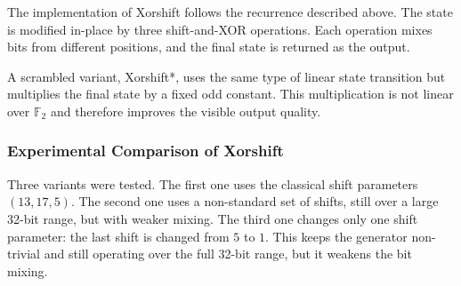 The implementation of Xorshift follows the recurrence described above. The state is modified in-place by three shift-and-XOR operations. Each operation mixes bits from different positions, and the final state is returned as the output.


A scrambled variant, Xorshift*, uses the same type of linear state transition but multiplies the final state by a fixed odd constant. This multiplication is not linear over $\mathbb{F}_2$ and therefore improves the visible output quality.


\subsubsection{Experimental Comparison of Xorshift}

Three variants were tested. The first one uses the classical shift parameters $(13,17,5)$. The second one uses a non-standard set of shifts, still over a large 32-bit range, but with weaker mixing. The third one changes only one shift parameter: the last shift is changed from $5$ to $1$. This keeps the generator non-trivial and still operating over the full 32-bit range, but it weakens the bit mixing.

\begin{table}[htbp]
\centering
\small
{}
\caption{Xorshift parameter sets used in the experiment}
\label{tab:xorshift-parameters}
\end{table}

